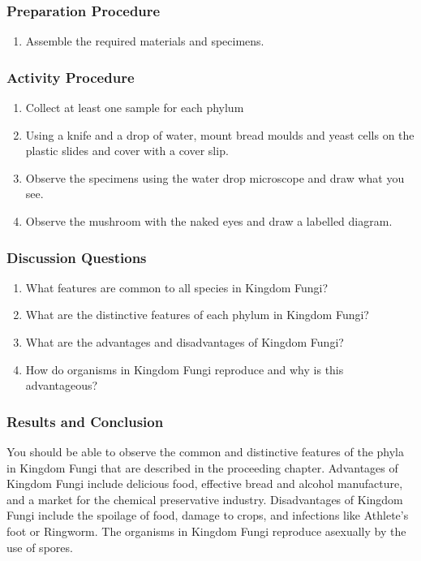 \subsubsection*{Preparation Procedure}
\begin{enumerate}
\item{Assemble the required materials and specimens.}
\end{enumerate}

\subsubsection*{Activity Procedure}
\begin{enumerate}
\item{Collect at least one sample for each phylum}
\item{Using a knife and a drop of water, mount bread moulds and yeast cells on the plastic slides and cover with a cover slip.}
\item{Observe the specimens using the water drop microscope and draw what you see.}
\item{Observe the mushroom with the naked eyes and draw a labelled diagram.}
\end{enumerate}

\subsubsection*{Discussion Questions}
\begin{enumerate}
\item{What features are common to all species in Kingdom Fungi?}
\item{What are the distinctive features of each phylum in Kingdom Fungi?}
\item{What are the advantages and disadvantages of Kingdom Fungi?}
\item{How do organisms in Kingdom Fungi reproduce and why is this advantageous?}
\end{enumerate}

\subsubsection*{Results and Conclusion}
You should be able to observe the common and distinctive features of the phyla in Kingdom Fungi that are described in the proceeding chapter. Advantages of Kingdom Fungi include delicious food, effective bread and alcohol manufacture, and a market for the chemical preservative industry. Disadvantages of Kingdom Fungi include the spoilage of food, damage to crops, and infections like Athlete's foot or Ringworm. The organisms in Kingdom Fungi reproduce asexually by the use of spores.


